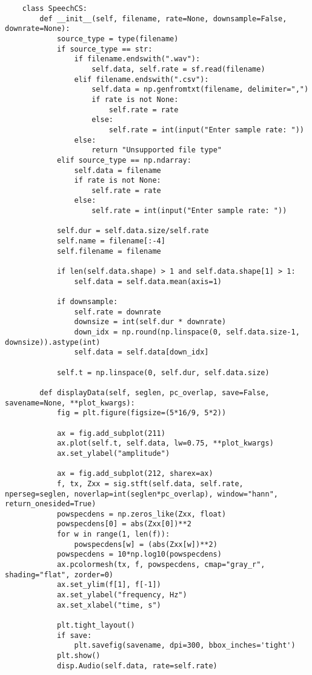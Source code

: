 \begin{lstlisting}
	class SpeechCS:
		def __init__(self, filename, rate=None, downsample=False, downrate=None):
			source_type = type(filename)
			if source_type == str:
				if filename.endswith(".wav"):
					self.data, self.rate = sf.read(filename)
				elif filename.endswith(".csv"):
					self.data = np.genfromtxt(filename, delimiter=",")
					if rate is not None:
						self.rate = rate
					else:
						self.rate = int(input("Enter sample rate: "))
				else:
					return "Unsupported file type"
			elif source_type == np.ndarray:
				self.data = filename
				if rate is not None:
					self.rate = rate
				else:
					self.rate = int(input("Enter sample rate: "))
			
			self.dur = self.data.size/self.rate
			self.name = filename[:-4]
			self.filename = filename
			
			if len(self.data.shape) > 1 and self.data.shape[1] > 1:
				self.data = self.data.mean(axis=1)
			
			if downsample:
				self.rate = downrate
				downsize = int(self.dur * downrate)
				down_idx = np.round(np.linspace(0, self.data.size-1, downsize)).astype(int)
				self.data = self.data[down_idx]
			
			self.t = np.linspace(0, self.dur, self.data.size)
		
		def displayData(self, seglen, pc_overlap, save=False, savename=None, **plot_kwargs):
			fig = plt.figure(figsize=(5*16/9, 5*2))
			
			ax = fig.add_subplot(211)
			ax.plot(self.t, self.data, lw=0.75, **plot_kwargs)
			ax.set_ylabel("amplitude")
			
			ax = fig.add_subplot(212, sharex=ax)
			f, tx, Zxx = sig.stft(self.data, self.rate, nperseg=seglen, noverlap=int(seglen*pc_overlap), window="hann", return_onesided=True)
			powspecdens = np.zeros_like(Zxx, float)
			powspecdens[0] = abs(Zxx[0])**2
			for w in range(1, len(f)):
				powspecdens[w] = (abs(Zxx[w])**2)
			powspecdens = 10*np.log10(powspecdens)
			ax.pcolormesh(tx, f, powspecdens, cmap="gray_r", shading="flat", zorder=0)
			ax.set_ylim(f[1], f[-1])
			ax.set_ylabel("frequency, Hz")
			ax.set_xlabel("time, s")
			
			plt.tight_layout()
			if save:
				plt.savefig(savename, dpi=300, bbox_inches='tight')
			plt.show()
			disp.Audio(self.data, rate=self.rate)
		

\end{lstlisting}

